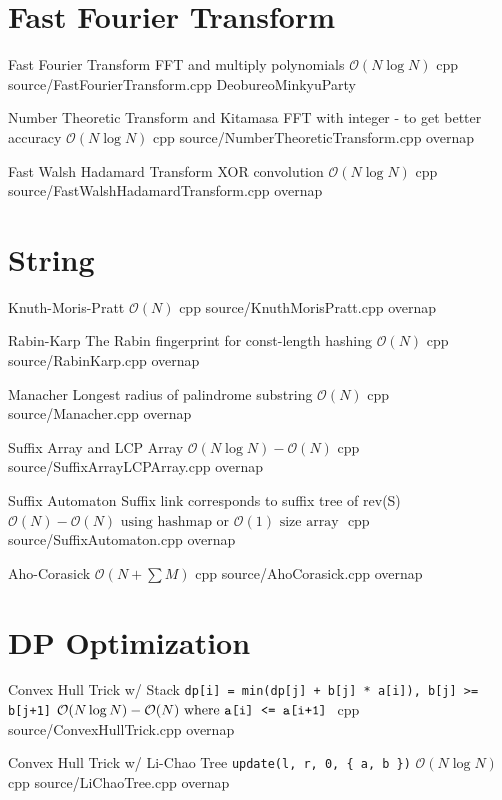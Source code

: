 \documentclass[landscape, 10pt, a4paper, oneside, twocolumn]{extarticle}
\begin{document}
\section{Fast Fourier Transform}

\Algorithm
{Fast Fourier Transform}
{FFT and multiply polynomials}
{$\mathcal{O}(N\log{N})$}
{cpp}
{source/FastFourierTransform.cpp}
{DeobureoMinkyuParty}

\Algorithm
{Number Theoretic Transform and Kitamasa}
{FFT with integer - to get better accuracy}
{$\mathcal{O}(N\log{N})$}
{cpp}
{source/NumberTheoreticTransform.cpp}
{overnap}

\Algorithm
{Fast Walsh Hadamard Transform}
{XOR convolution}
{$\mathcal{O}(N\log{N})$}
{cpp}
{source/FastWalshHadamardTransform.cpp}
{overnap}

\section{String}

\Algorithm
{Knuth-Moris-Pratt}
{}
{$\mathcal{O}(N)$}
{cpp}
{source/KnuthMorisPratt.cpp}
{overnap}

\Algorithm
{Rabin-Karp}
{The Rabin fingerprint for const-length hashing}
{$\mathcal{O}(N)$}
{cpp}
{source/RabinKarp.cpp}
{overnap}

\Algorithm
{Manacher}
{Longest radius of palindrome substring}
{$\mathcal{O}(N)$}
{cpp}
{source/Manacher.cpp}
{overnap}

\Algorithm
{Suffix Array and LCP Array}
{}
{$\mathcal{O}(N\log{N})-\mathcal{O}(N)$}
{cpp}
{source/SuffixArrayLCPArray.cpp}
{overnap}

\Algorithm
{Suffix Automaton}
{Suffix link corresponds to suffix tree of rev(S)}
{$\mathcal{O}(N)-\mathcal{O}(N)\text{ using hashmap or $\mathcal{O}(1)$ size array }$}
{cpp}
{source/SuffixAutomaton.cpp}
{overnap}

\Algorithm
{Aho-Corasick}
{}
{$\mathcal{O}(N+\sum{M})$}
{cpp}
{source/AhoCorasick.cpp}
{overnap}


\section{DP Optimization}

\Algorithm
{Convex Hull Trick w/ Stack}
{\texttt{dp[i] = min(dp[j] + b[j] * a[i]), b[j] >= b[j+1]}}
{$\mathcal{O}(N\log{N})-\mathcal{O}(N)\text{ where \texttt{a[i] <= a[i+1]} }$}
{cpp}
{source/ConvexHullTrick.cpp}
{overnap}

\Algorithm
{Convex Hull Trick w/ Li-Chao Tree}
{\texttt{update(l, r, 0, \{ a, b \})}}
{$\mathcal{O}(N\log{N})$}
{cpp}
{source/LiChaoTree.cpp}
{overnap}
\end{document}

